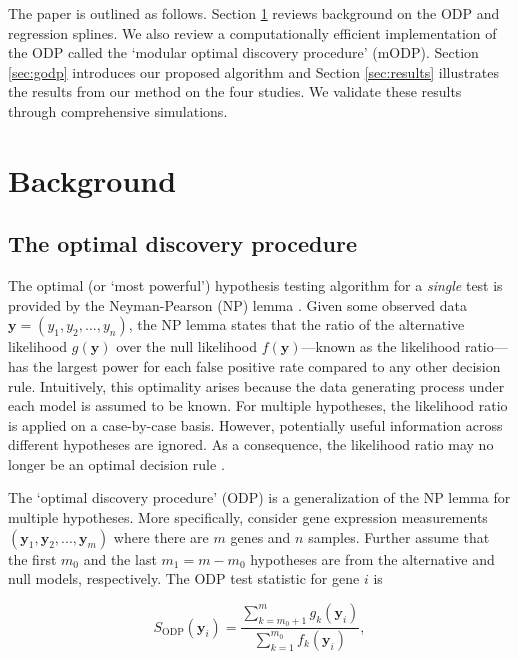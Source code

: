 \documentclass[11pt]{article}
\begin{document}
The paper is outlined as follows. Section \ref{sec:background} reviews background on the ODP and regression splines. We also review a computationally efficient implementation of the ODP called the `modular optimal discovery procedure' (mODP). Section \ref{sec:godp} introduces our proposed algorithm and Section \ref{sec:results} illustrates the results from our method on the four studies. We validate these results through comprehensive simulations.

\section{Background}
\label{sec:background}
\subsection{The optimal discovery procedure}

The optimal (or `most powerful') hypothesis testing algorithm for a \textit{single} test is provided by the Neyman-Pearson (NP) lemma \citep{neyman1933}. Given some observed data $\mathbf{y} = (y_{1}, y_{2}, ..., y_{n})$, the NP lemma states that the ratio of the alternative likelihood $g(\mathbf{y})$ over the null likelihood $f(\mathbf{y})$---known as the likelihood ratio---has the largest power for each false positive rate compared to any other decision rule. Intuitively, this optimality arises because the data generating process under each model is assumed to be known. For multiple hypotheses, the likelihood ratio is applied on a case-by-case basis. However, potentially useful information across different hypotheses are ignored. As a consequence, the likelihood ratio may no longer be an optimal decision rule \citep{Storey_2007_odp}.

The `optimal discovery procedure' (ODP) is a generalization of the NP lemma for multiple hypotheses. More specifically, consider gene expression measurements $(\mathbf{y}_{1}, \mathbf{y}_{2}, ..., \mathbf{y}_{m})$ where there are $m$ genes and $n$ samples. Further assume that the first $m_{0}$ and the last $m_{1}=m-m_{0}$ hypotheses are from the alternative and null models, respectively. The ODP test statistic for gene $i$ is

\begin{equation}
S_{\text{ODP}}(\mathbf{y}_{i}) = \dfrac{\sum_{k=m_{0} + 1}^{m} g_{k}(\mathbf{y}_{i})}{\sum_{k=1}^{m_{0}} f_{k}(\mathbf{y}_{i})},
\label{eq:odp}
\end{equation}
\end{document}
